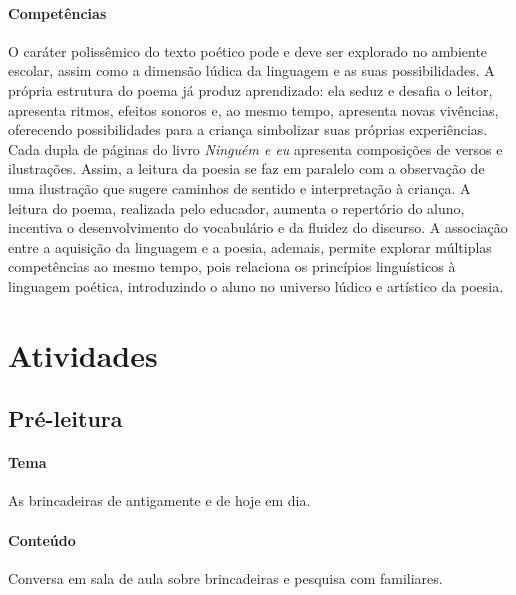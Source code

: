 \documentclass[11pt]{extarticle}
\begin{document}
\paragraph{Competências} 
O caráter polissêmico do texto poético pode e deve ser explorado no ambiente escolar, assim como a dimensão lúdica da linguagem e as suas possibilidades. A própria estrutura do poema já produz aprendizado: ela seduz e desafia o leitor, apresenta ritmos, efeitos sonoros e, ao mesmo tempo, apresenta novas vivências, oferecendo possibilidades para a criança simbolizar suas próprias experiências. Cada dupla de páginas do livro \textit{Ninguém e eu} apresenta composições de versos e ilustrações. Assim, a leitura da poesia se faz em paralelo com a observação de uma ilustração que sugere caminhos de sentido e interpretação à criança. A leitura do poema, realizada pelo educador, aumenta o repertório do aluno, incentiva o desenvolvimento do vocabulário e da fluidez do discurso. A associação entre a aquisição da linguagem e a poesia, ademais, permite explorar múltiplas competências ao mesmo tempo, pois relaciona os princípios linguísticos à linguagem poética, introduzindo o aluno no universo lúdico e artístico da poesia.

\section{Atividades}

\subsection{Pré-leitura}


\paragraph{Tema} As brincadeiras de antigamente e de hoje em dia.

\paragraph{Conteúdo} Conversa em sala de aula sobre brincadeiras e pesquisa com familiares.
\end{document}
